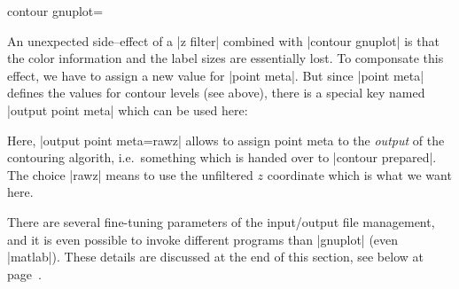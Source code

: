 {{\begin{plottype}[/pgfplots]{contour gnuplot=\textcolor{black}{}}
\begin{codeexample}[]
%
\end{codeexample}
	
	An unexpected side--effect of a |z filter| combined with |contour gnuplot| is that the color information and the label sizes are essentially lost. To componsate this effect, we have to assign a new value for |point meta|. But since |point meta| defines the values for contour levels (see above), there is a special key named |output point meta| which can be used here:

\pgfplotsexpensiveexample
\begin{codeexample}[]%
%
\end{codeexample}
	
	Here, |output point meta=rawz| allows to assign point meta to the \emph{output} of the contouring algorith, i.e.\ something which is handed over to |contour prepared|. The choice |rawz| means to use the unfiltered $z$ coordinate which is what we want here.


	There are several fine-tuning parameters of the input/output file management, and it is even possible to invoke different programs than |gnuplot| (even |matlab|). These details are discussed at the end of this section, see below at page~\pageref{key:pgfplots:contour:gnuplot}.
\end{plottype}

}}
